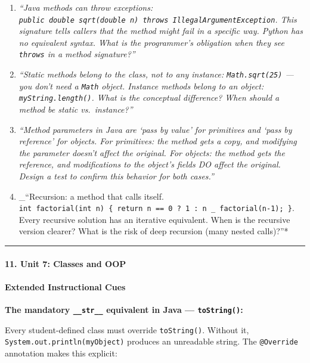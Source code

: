 \documentclass[
  justified,
  openright,
]{tufte-book}
\let\subsection\paragraph
\let\paragraph\paragraph
\let\subsection\paragraph
\let\paragraph\paragraph
\begin{document}
\begin{enumerate}
\def\labelenumi{\arabic{enumi}.}
\item
  \emph{``Java methods can throw exceptions:
  \texttt{public\ double\ sqrt(double\ n)\ throws\ IllegalArgumentException}.
  This signature tells callers that the method might fail in a specific
  way. Python has no equivalent syntax. What is the programmer's
  obligation when they see \texttt{throws} in a method signature?''}
\item
  \emph{``Static methods belong to the class, not to any instance:
  \texttt{Math.sqrt(25)} --- you don't need a \texttt{Math} object.
  Instance methods belong to an object: \texttt{myString.length()}. What
  is the conceptual difference? When should a method be static
  vs.~instance?''}
\item
  \emph{``Method parameters in Java are `pass by value' for primitives
  and `pass by reference' for objects. For primitives: the method gets a
  copy, and modifying the parameter doesn't affect the original. For
  objects: the method gets the reference, and modifications to the
  object's fields DO affect the original. Design a test to confirm this
  behavior for both cases.''}
\item
  \_``Recursion: a method that calls itself.
  \texttt{int\ factorial(int\ n)\ \{\ return\ n\ ==\ 0\ ?\ 1\ :\ n\ \_\ factorial(n-1);\ \}}.
  Every recursive solution has an iterative equivalent. When is the
  recursive version clearer? What is the risk of deep recursion (many
  nested calls)?''*
\end{enumerate}

\begin{center}\rule{0.5\linewidth}{0.5pt}\end{center}

\subsection{11. Unit 7: Classes and OOP}\label{unit-7-classes-and-oop-1}

\subsection{Extended Instructional
Cues}\label{extended-instructional-cues-5}

\textbf{The mandatory \texttt{\_\_str\_\_} equivalent in Java ---
\texttt{toString()}:}

Every student-defined class must override \texttt{toString()}. Without
it, \texttt{System.out.println(myObject)} produces an unreadable string.
The \texttt{@Override} annotation makes this explicit:
\end{document}
